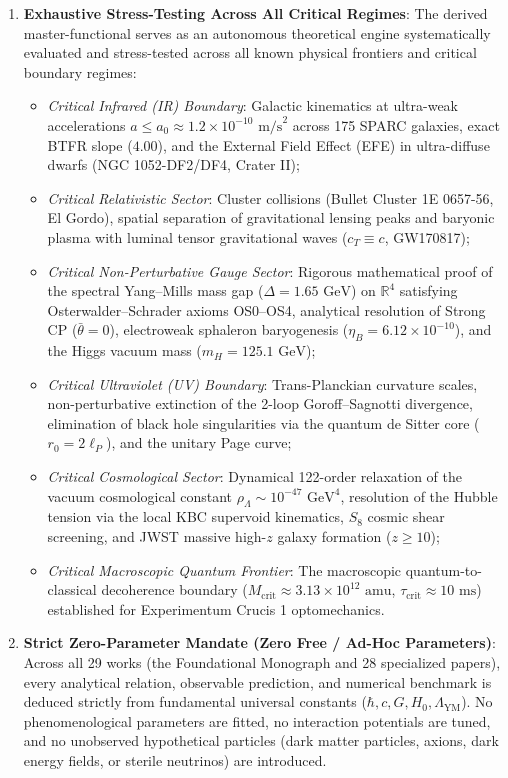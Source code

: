 \documentclass[11pt,a4paper]{article}
\theoremstyle{definition}
\begin{document}
\begin{enumerate}
\item \textbf{Exhaustive Stress-Testing Across All Critical Regimes}: The derived master-functional serves as an autonomous theoretical engine systematically evaluated and stress-tested across all known physical frontiers and critical boundary regimes:
\begin{itemize}
\item \textit{Critical Infrared (IR) Boundary}: Galactic kinematics at ultra-weak accelerations $a \le a_0 \approx 1.2 \times 10^{-10}\text{ m/s}^2$ across 175 SPARC galaxies, exact BTFR slope ($4.00$), and the External Field Effect (EFE) in ultra-diffuse dwarfs (NGC 1052-DF2/DF4, Crater II);
\item \textit{Critical Relativistic Sector}: Cluster collisions (Bullet Cluster 1E 0657-56, El Gordo), spatial separation of gravitational lensing peaks and baryonic plasma with luminal tensor gravitational waves ($c_T \equiv c$, GW170817);
\item \textit{Critical Non-Perturbative Gauge Sector}: Rigorous mathematical proof of the spectral Yang--Mills mass gap ($\Delta = 1.65\text{ GeV}$) on $\mathbb{R}^4$ satisfying Osterwalder--Schrader axioms OS0--OS4, analytical resolution of Strong CP ($\bar{\theta} = 0$), electroweak sphaleron baryogenesis ($\eta_B = 6.12 \times 10^{-10}$), and the Higgs vacuum mass ($m_H = 125.1\text{ GeV}$);
\item \textit{Critical Ultraviolet (UV) Boundary}: Trans-Planckian curvature scales, non-perturbative extinction of the 2-loop Goroff--Sagnotti divergence, elimination of black hole singularities via the quantum de Sitter core ($r_0 = 2\ell_P$), and the unitary Page curve;
\item \textit{Critical Cosmological Sector}: Dynamical 122-order relaxation of the vacuum cosmological constant $\rho_\Lambda \sim 10^{-47}\text{ GeV}^4$, resolution of the Hubble tension via the local KBC supervoid kinematics, $S_8$ cosmic shear screening, and JWST massive high-$z$ galaxy formation ($z \ge 10$);
\item \textit{Critical Macroscopic Quantum Frontier}: The macroscopic quantum-to-classical decoherence boundary ($M_{\text{crit}} \approx 3.13 \times 10^{12}\text{ amu}$, $\tau_{\text{crit}} \approx 10\text{ ms}$) established for Experimentum Crucis 1 optomechanics.
\end{itemize}

\item \textbf{Strict Zero-Parameter Mandate (Zero Free / Ad-Hoc Parameters)}: Across all 29 works (the Foundational Monograph and 28 specialized papers), every analytical relation, observable prediction, and numerical benchmark is deduced strictly from fundamental universal constants ($\hbar, c, G, H_0, \Lambda_{\mathrm{YM}}$). No phenomenological parameters are fitted, no interaction potentials are tuned, and no unobserved hypothetical particles (dark matter particles, axions, dark energy fields, or sterile neutrinos) are introduced.
\end{enumerate}
\end{document}
